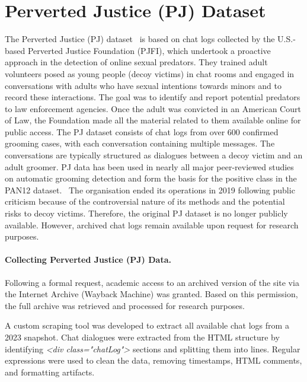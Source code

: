 \section{Perverted Justice (PJ) Dataset}
The Perverted Justice (PJ) dataset~\cite{pj} is based on chat logs collected by the U.S.-based Perverted Justice Foundation (PJFI), which undertook a proactive approach in the detection of online sexual predators. They trained adult volunteers posed as young people (decoy victims) in chat rooms and engaged in conversations with adults who have sexual intentions towards minors and to record these interactions. The goal was to identify and report potential predators to law enforcement agencies. Once the adult was convicted in an American Court of Law, the Foundation made all the material related to them available online for public access. The PJ dataset consists of chat logs from over 600 confirmed grooming cases, with each conversation containing multiple messages. The conversations are typically structured as dialogues between a decoy victim and an adult groomer. PJ data has been used in nearly all major peer-reviewed studies on automatic grooming detection and form the basis for the positive class in the PAN12 dataset.~\cite{inches2012pan} 
The organisation ended its operations in 2019 following public criticism because of the controversial nature of its methods and the potential risks to decoy victims. Therefore, the original PJ dataset is no longer publicly available. However, archived chat logs remain available upon request for research purposes.~\cite{pj}


\paragraph{Collecting Perverted Justice (PJ) Data.}

 Following a formal request, academic access to an archived version of the site via the Internet Archive (Wayback Machine) was granted. Based on this permission, the full archive was retrieved and processed for research purposes.

A custom scraping tool was developed to extract all available chat logs from a 2023 snapshot. Chat dialogues were extracted from the HTML structure by identifying \textit{<div class="chatLog">} sections and splitting them into lines. Regular expressions were used to clean the data, removing timestamps, HTML comments, and formatting artifacts. 

